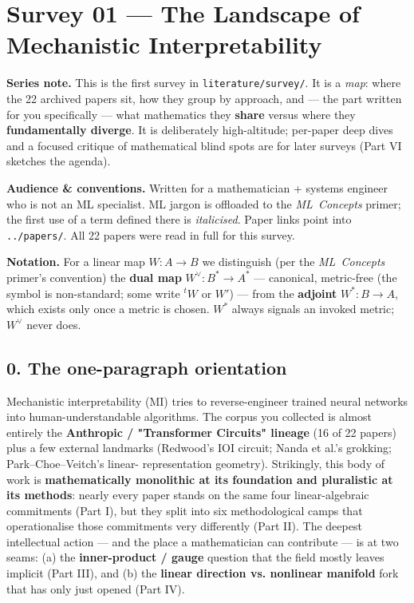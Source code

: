 

\section*{Survey 01 --- The Landscape of Mechanistic Interpretability}

\begin{callout}
\textbf{Series note.} This is the first survey in \texttt{literature/survey/}. It is a \emph{map}: where the 22 archived papers sit, how they group by approach, and --- the part written for you specifically --- what mathematics they \textbf{share} versus where they \textbf{fundamentally diverge}. It is deliberately high-altitude; per-paper deep dives and a focused critique of mathematical blind spots are for later surveys (Part VI sketches the agenda).


\textbf{Audience \& conventions.} Written for a mathematician + systems engineer who is not an ML specialist. ML jargon is offloaded to the \emph{ML~Concepts} primer; the first use of a term defined there is \emph{italicised}. Paper links point into \texttt{../papers/}. All 22 papers were read in full for this survey.


\textbf{Notation.} For a linear map $W:A\to B$ we distinguish (per the \emph{ML~Concepts} primer's convention) the \textbf{dual map} $W^{\vee}:B^{*}\to A^{*}$ --- canonical, metric-free (the symbol is non-standard; some write ${}^{t}W$ or $W'$) --- from the \textbf{adjoint} $W^{*}:B\to A$, which exists only once a metric is chosen. $W^{*}$ always signals an invoked metric; $W^{\vee}$ never does.

\end{callout}


\subsection*{0. The one-paragraph orientation}

Mechanistic interpretability (MI) tries to reverse-engineer trained neural networks into human-understandable algorithms. The corpus you collected is almost entirely the \textbf{Anthropic / "Transformer Circuits" lineage} (16 of 22 papers) plus a few external landmarks (Redwood's IOI circuit; Nanda et al.'s grokking; Park--Choe--Veitch's linear- representation geometry). Strikingly, this body of work is \textbf{mathematically monolithic at its foundation and pluralistic at its methods}: nearly every paper stands on the same four linear-algebraic commitments (Part I), but they split into six methodological camps that operationalise those commitments very differently (Part II). The deepest intellectual action --- and the place a mathematician can contribute --- is at two seams: (a) the \textbf{inner-product / gauge} question that the field mostly leaves implicit (Part III), and (b) the \textbf{linear direction vs. nonlinear manifold} fork that has only just opened (Part IV).



